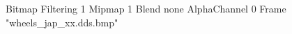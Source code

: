 {Bitmap
	{Filtering 1}
	{Mipmap 1}
	{Blend none}
	{AlphaChannel 0}
	{Frame "wheels_jap_xx.dds.bmp"}
}
